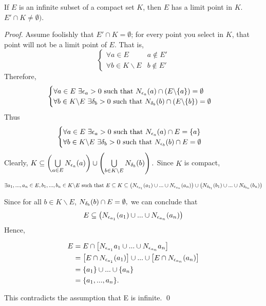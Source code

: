 	\begin{theorem}
		If $E$ is an infinite subset of a compact set $K$, then $E$ has a limit point in $K$. $E'\cap K \not = \emptyset)$.
	\end{theorem}
	
	\begin{proof}
		Assume foolishly that $E'\cap K = \emptyset$; for every point you select in $K$, that point will not be a limit point of $E$. That is,
		$$
		\begin{cases}
			\forall a \in E &a\not \in E' \\
			\forall b \in K \backslash E &b\not \in E'
		\end{cases}
		$$
		Therefore,
		$$
		\begin{cases}
			\forall a \in E ~\exists \epsilon_a > 0 \text{ such that } N_{\epsilon_a}(a)\cap (E \backslash \{a\})=\emptyset \\
			\forall b \in K \backslash E ~\exists \delta_b > 0 \text{ such that } N_{\delta_b}(b)\cap (E \backslash \{b\})=\emptyset \\
		\end{cases}
		$$
		Thus
		$$
		\begin{cases}
			\forall a \in E ~\exists \epsilon_a > 0 \text{ such that } N_{\epsilon_a}(a)\cap E = \{a\} \\
			\forall b \in K \backslash E ~\exists \delta_b > 0 \text{ such that } N_{\epsilon_b}(b)\cap E = \emptyset
		\end{cases}
		$$
		Clearly, $K \subseteq \left( \bigcup \limits_{a\in E} N_{\epsilon_a}(a)
		\right) \cup \left( \bigcup \limits_{b\in K\backslash E} N_{\delta_b}(b)\right).$ Since $K$ is compact,
		
		$$\exists a_1,...,a_n \in E, b_1,...,b_n \in K \backslash E \text{ such that } \\ E \subseteq K \subseteq \left(N_{\epsilon_{a_1}}(a_1)\cup...\cup N_{\epsilon_{a_n}}(a_n)\right)\cup \left(N_{\delta_{b_1}}(b_1)\cup...\cup N_{\delta_{b_n}}(b_n)\right) $$
		
		Since for all $b\in K \backslash E$, $N_{\delta_b}(b)\cap E = \emptyset,$ we can conclude that
		$$E \subseteq \left( N_{\epsilon_{a_1}}(a_1) \cup...\cup N_{\epsilon_{a_n}}(a_n) \right)$$
		Hence, 
		
		\begin{align*}
			E &= E \cap \left[ N_{\epsilon_{a_1}}a_1 \cup ... \cup N_{\epsilon_{a_n}}a_n \right] \\
				&= \left [E\cap N_{\epsilon_{a_1}}(a_1) \right] \cup ... \cup \left[ E \cap N_{\epsilon_{a_n}}(a_n)\right] \\
				&= \{a_1\} \cup ... \cup \{a_n\} \\
				&= \{a_1,...,a_n\}.
		\end{align*}
		
		This contradicts the assumption that E is infinite. \qed
	\end{proof}
	
